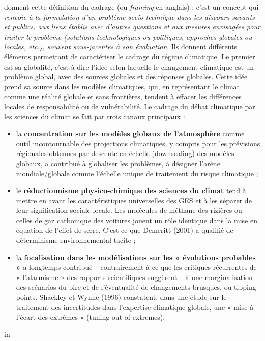 \cite{aykut_gouverner_nodate} donnent cette définition du cadrage (ou \emph{framing} en anglais) : c'est un concept qui  \emph{renvoie à la formulation d’un problème socio-technique dans les discours savants et publics, aux liens établis avec d’autres questions et aux mesures envisagées pour traiter le problème (solutions technologiques ou politiques, approches globales ou locales, etc.), souvent sous-jacentes à son évaluation}. Ils donnent différents éléments permettant de caractériser le cadrage du régime climatique. Le premier est sa globalité, c'est à dire l'idée selon laquelle le changement climatique est un problème global, avec des sources globales et des réponses globales. Cette idée prend sa source dans les modèles climatiques, qui, en représentant le climat comme une réalité globale et sans frontières, tendent à effacer les différences locales de responsabilité ou de vulnérabilité. Le cadrage du débat climatique par les sciences du climat se fait par trois canaux principaux : 



\begin{displayquote}
\begin{itemize}
    \item la \textbf{concentration sur les modèles globaux de l’atmosphère} comme outil incontournable des projections climatiques, y compris pour les prévisions régionales obtenues par descente en échelle (downscaling) des modèles globaux, a contribué à globaliser les problèmes, à désigner l’arène mondiale/globale comme l’échelle unique de traitement du risque climatique ;
	\item le \textbf{réductionnisme physico-chimique des sciences du climat} tend à mettre en avant les caractéristiques universelles des GES et à les séparer de leur signification sociale locale. Les molécules de méthane des rizières ou celles de gaz carbonique des voitures jouent un rôle identique dans la mise en équation de l’effet de serre. C’est ce que Demeritt (2001) a qualifié de déterminisme environnemental tacite ;
	\item la \textbf{focalisation dans les modélisations sur les « évolutions probables »} a longtemps contribué – contrairement à ce que les critiques récurrentes de « l’alarmisme » des rapports scientifiques suggèrent – à une marginalisation des scénarios du pire et de l’éventualité de changements brusques, ou tipping points. Shackley et Wynne (1996) constatent, dans une étude sur le traitement des incertitudes dans l’expertise climatique globale, une « mise à l’écart des extrêmes » (tuning out of extremes).
\end{itemize}

in \cite{aykut_gouverner_nodate}
\end{displayquote}

